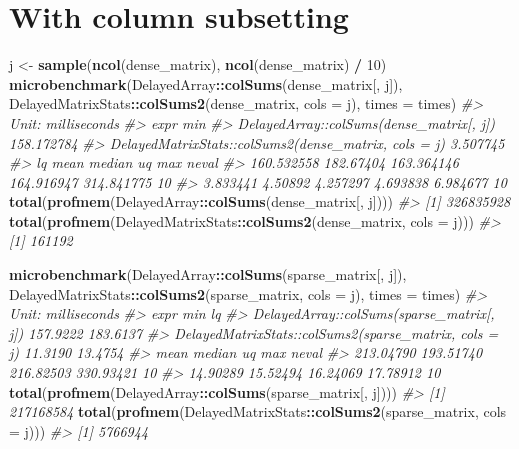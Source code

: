 \documentclass[]{book}
\newenvironment{Shaded}{\begin{snugshade}}{\end{snugshade}}
\newcommand{\KeywordTok}[1]{\textcolor[rgb]{0.13,0.29,0.53}{\textbf{#1}}}
\newcommand{\DataTypeTok}[1]{\textcolor[rgb]{0.13,0.29,0.53}{#1}}
\newcommand{\DecValTok}[1]{\textcolor[rgb]{0.00,0.00,0.81}{#1}}
\newcommand{\StringTok}[1]{\textcolor[rgb]{0.31,0.60,0.02}{#1}}
\newcommand{\CommentTok}[1]{\textcolor[rgb]{0.56,0.35,0.01}{\textit{#1}}}
\newcommand{\OperatorTok}[1]{\textcolor[rgb]{0.81,0.36,0.00}{\textbf{#1}}}
\newcommand{\NormalTok}[1]{#1}
\begin{document}
\section{With column subsetting}\label{with-column-subsetting}

\begin{Shaded}
\begin{Highlighting}[]
\NormalTok{j <-}\StringTok{ }\KeywordTok{sample}\NormalTok{(}\KeywordTok{ncol}\NormalTok{(dense_matrix), }\KeywordTok{ncol}\NormalTok{(dense_matrix) }\OperatorTok{/}\StringTok{ }\DecValTok{10}\NormalTok{)}
\KeywordTok{microbenchmark}\NormalTok{(DelayedArray}\OperatorTok{::}\KeywordTok{colSums}\NormalTok{(dense_matrix[, j]),}
\NormalTok{               DelayedMatrixStats}\OperatorTok{::}\KeywordTok{colSums2}\NormalTok{(dense_matrix, }\DataTypeTok{cols =}\NormalTok{ j),}
               \DataTypeTok{times =}\NormalTok{ times)}
\CommentTok{#> Unit: milliseconds}
\CommentTok{#>                                                  expr        min}
\CommentTok{#>              DelayedArray::colSums(dense_matrix[, j]) 158.172784}
\CommentTok{#>  DelayedMatrixStats::colSums2(dense_matrix, cols = j)   3.507745}
\CommentTok{#>          lq      mean     median         uq        max neval}
\CommentTok{#>  160.532558 182.67404 163.364146 164.916947 314.841775    10}
\CommentTok{#>    3.833441   4.50892   4.257297   4.693838   6.984677    10}
\KeywordTok{total}\NormalTok{(}\KeywordTok{profmem}\NormalTok{(DelayedArray}\OperatorTok{::}\KeywordTok{colSums}\NormalTok{(dense_matrix[, j])))}
\CommentTok{#> [1] 326835928}
\KeywordTok{total}\NormalTok{(}\KeywordTok{profmem}\NormalTok{(DelayedMatrixStats}\OperatorTok{::}\KeywordTok{colSums2}\NormalTok{(dense_matrix, }\DataTypeTok{cols =}\NormalTok{ j)))}
\CommentTok{#> [1] 161192}

\KeywordTok{microbenchmark}\NormalTok{(DelayedArray}\OperatorTok{::}\KeywordTok{colSums}\NormalTok{(sparse_matrix[, j]),}
\NormalTok{               DelayedMatrixStats}\OperatorTok{::}\KeywordTok{colSums2}\NormalTok{(sparse_matrix, }\DataTypeTok{cols =}\NormalTok{ j),}
               \DataTypeTok{times =}\NormalTok{ times)}
\CommentTok{#> Unit: milliseconds}
\CommentTok{#>                                                   expr      min       lq}
\CommentTok{#>              DelayedArray::colSums(sparse_matrix[, j]) 157.9222 183.6137}
\CommentTok{#>  DelayedMatrixStats::colSums2(sparse_matrix, cols = j)  11.3190  13.4754}
\CommentTok{#>       mean    median        uq       max neval}
\CommentTok{#>  213.04790 193.51740 216.82503 330.93421    10}
\CommentTok{#>   14.90289  15.52494  16.24069  17.78912    10}
\KeywordTok{total}\NormalTok{(}\KeywordTok{profmem}\NormalTok{(DelayedArray}\OperatorTok{::}\KeywordTok{colSums}\NormalTok{(sparse_matrix[, j])))}
\CommentTok{#> [1] 217168584}
\KeywordTok{total}\NormalTok{(}\KeywordTok{profmem}\NormalTok{(DelayedMatrixStats}\OperatorTok{::}\KeywordTok{colSums2}\NormalTok{(sparse_matrix, }\DataTypeTok{cols =}\NormalTok{ j)))}
\CommentTok{#> [1] 5766944}


\end{Highlighting}
\end{Shaded}
\end{document}
